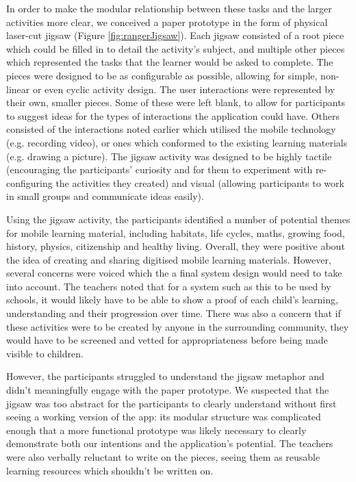 In order to make the modular relationship between these tasks and the larger activities more clear, we conceived a paper prototype in the form of physical laser-cut jigsaw (Figure \ref{fig:rangerJigsaw}). Each jigsaw consisted of a root piece which could be filled in to detail the activity’s subject, and multiple other pieces which represented the tasks that the learner would be asked to complete. The pieces were designed to be as configurable as possible, allowing for simple, non-linear or even cyclic activity design. The user interactions were represented by their own, smaller pieces. Some of these were left blank, to allow for participants to suggest ideas for the types of interactions the application could have. Others consisted of the interactions noted earlier which utilised the mobile technology (e.g. recording video), or ones which conformed to the existing learning materials (e.g. drawing a picture). The jigsaw activity was designed to be highly tactile (encouraging the participants’ curiosity and for them to experiment with re-configuring the activities they created) and visual (allowing participants to work in small groups and communicate ideas easily).

Using the jigsaw activity, the participants identified a number of potential themes for mobile learning material, including habitats, life cycles, maths, growing food, history, physics, citizenship and healthy living. Overall, they were positive about the idea of creating and sharing digitised mobile learning materials. However, several concerns were voiced which the a final system design would need to take into account. The teachers noted that for a system such as this to be used by schools, it would likely have to be able to show a proof of each child’s learning, understanding and their progression over time. There was also a concern that if these activities were to be created by anyone in the surrounding community, they would have to be screened and vetted for appropriateness before being made visible to children.

However, the participants struggled to understand the jigsaw metaphor and didn't meaningfully engage with the paper prototype. We suspected that the jigsaw was too abstract for the participants to clearly understand without first seeing a working version of the app: its modular structure was complicated enough that a more functional prototype was likely necessary to clearly demonstrate both our intentions and the application’s potential. The teachers were also verbally reluctant to write on the pieces, seeing them as reusable learning resources which shouldn't be written on.

